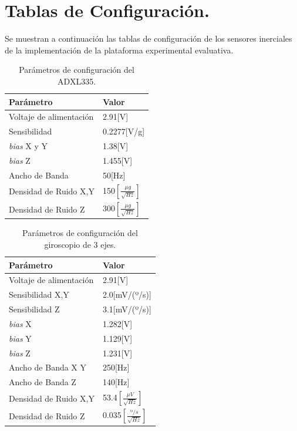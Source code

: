 \documentclass[10pt]{report}
\numberwithin{equation}{chapter}
\numberwithin{algorithm}{chapter}
\begin{document}
\section{Tablas de Configuración.}
Se muestran a continuación las tablas de configuración de los sensores inerciales de la implementación de la plataforma experimental evaluativa.
\begin{table}[h!]
\begin{center}
\begin{tabular}{|p{1.65in}|p{0.9in}|}
\hline
\textbf{Parámetro}&\textbf{Valor}\\ \hline
Voltaje de alimentación&2.91[V]\\ \hline
Sensibilidad&0.2277[V/g]\\ \hline
\emph{bias} X y Y&1.38[V]\\ \hline
\emph{bias} Z&1.455[V]\\ \hline
Ancho de Banda&50[Hz]\\ \hline
Densidad de Ruido X,Y&150$\left[\frac{\mu g}{\sqrt{Hz}}\right]$\\ \hline
Densidad de Ruido Z&300$\left[\frac{\mu g}{\sqrt{Hz}}\right]$\\ \hline
\end{tabular}
\end{center}
\caption{Parámetros de configuración del ADXL335.}
\label{obtencion_tb1}
\end{table}
\begin{table}
\begin{center}
\begin{tabular}{|p{1.65in}|p{0.9in}|}
\hline
\textbf{Parámetro}&\textbf{Valor}\\ \hline
Voltaje de alimentación&2.91[V]\\ \hline
Sensibilidad X,Y&2.0[mV/(º/s)]\\ \hline
Sensibilidad Z&3.1[mV/(º/s)]\\ \hline
\emph{bias} X&1.282[V]\\ \hline
\emph{bias} Y&1.129[V]\\ \hline
\emph{bias} Z&1.231[V]\\ \hline
Ancho de Banda X Y&250[Hz]\\ \hline
Ancho de Banda Z&140[Hz]\\ \hline
Densidad de Ruido X,Y&53.4$\left[\frac{\mu V}{\sqrt{Hz}}\right]$\\ \hline
Densidad de Ruido Z&0.035$\left[\frac{º/s}{\sqrt{Hz}}\right]$\\ \hline
\end{tabular}
\end{center}
\caption{Parámetros de configuración del giroscopio de 3 ejes.}
\label{obtencion_tb2}
\end{table}
\end{document}
